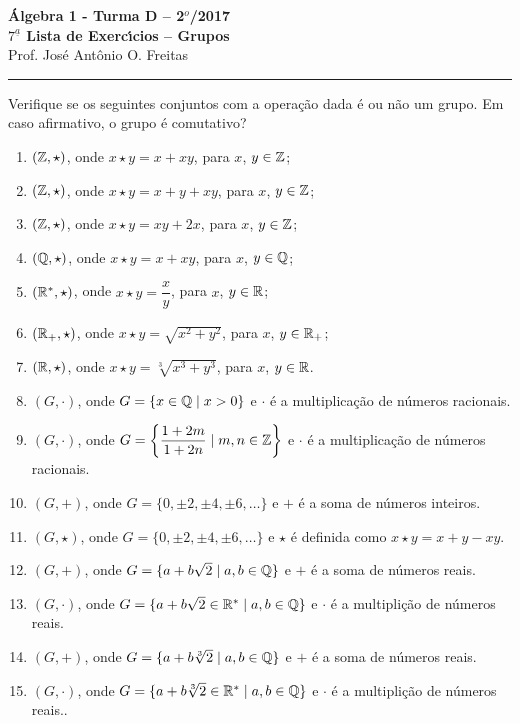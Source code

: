 \documentclass[12pt]{article}
\begin{document}


\begin{center}
{\Large\bf {\'A}lgebra 1 - Turma D -- 2$^{o}$/2017} \\ \vspace{9pt} {\large\bf
  $7^{\underline{a}}$ Lista de Exerc{\'\i}cios -- Grupos}\\
\vspace{9pt} Prof. Jos{\'e} Ant{\^o}nio O. Freitas
\end{center}
\hrule

\vspace{.6cm}
\questao Verifique se os seguintes conjuntos com a opera\c{c}\~ao dada \'e ou n\~ao um grupo. Em caso afirmativo, o grupo \'e comutativo?
\begin{enumerate}[label=({\alph*})]
	\item $(\mathbb{Z}, \star)$, onde $x \star y = x + xy$, para $x$, $y \in \mathbb{Z}$;
	\item $(\mathbb{Z}, \star)$, onde $x \star y = x + y + xy$, para $x$, $y \in \mathbb{Z}$;
	\item $(\mathbb{Z}, \star)$, onde $x \star y = xy + 2x$, para $x$, $y \in \mathbb{Z}$;
	\item $(\mathbb{Q}, \star)$, onde $x \star y = x + xy$, para $x$, $y \in \mathbb{Q}$;
	\item $(\mathbb{R}^*, \star)$, onde $x \star y = \dfrac{x}{y}$, para $x$, $y \in \mathbb{R}$;
	\item $(\mathbb{R}_+, \star)$, onde $x \star y = \sqrt{x^2 + y^2}$, para $x$, $y \in \mathbb{R}_+$;
	\item $(\mathbb{R}, \star)$, onde $x \star y = \sqrt[3]{x^3 + y^3}$, para $x$, $y \in \mathbb{R}$.
	\item $(G, \cdot)$, onde $G = \{x \in \mathbb{Q} \mid x > 0\}$ e $\cdot$ \'e a multiplica\c{c}\~ao de n\'umeros racionais.
	\item $(G, \cdot)$, onde $G = \left\{\dfrac{1 + 2m}{1 + 2n} \mid m, n \in \mathbb{Z}\right\}$ e $\cdot$ \'e a multiplica\c{c}\~ao de n\'umeros racionais.
	\item $(G, +)$, onde $G = \{0, \pm 2, \pm 4, \pm 6, \dots\}$ e $+$ \'e a soma de n\'umeros inteiros.
	\item $(G, \star)$, onde $G = \{0, \pm 2, \pm 4, \pm 6, \dots\}$ e $\star$ \'e definida como $x \star y = x + y - xy$.
	\item $(G, +)$, onde $G = \{a + b\sqrt{2} \mid a, b \in \mathbb{Q}\}$ e $+$ \'e a soma de n\'umeros reais.
	\item $(G, \cdot)$, onde $G = \{a + b\sqrt{2} \in \mathbb{R}^* \mid a, b \in \mathbb{Q}\}$ e $\cdot$ \'e a multipli\c{c}\~ao de n\'umeros reais.
	\item $(G, +)$, onde $G = \{a + b\sqrt[3]{2} \mid a, b \in \mathbb{Q}\}$ e $+$ \'e a soma de n\'umeros reais.
	\item $(G, \cdot)$, onde $G = \{a + b\sqrt[3]{2} \in \mathbb{R}^* \mid a, b \in \mathbb{Q}\}$ e $\cdot$ \'e a multipli\c{c}\~ao de n\'umeros reais..
\end{enumerate}
\end{document}
